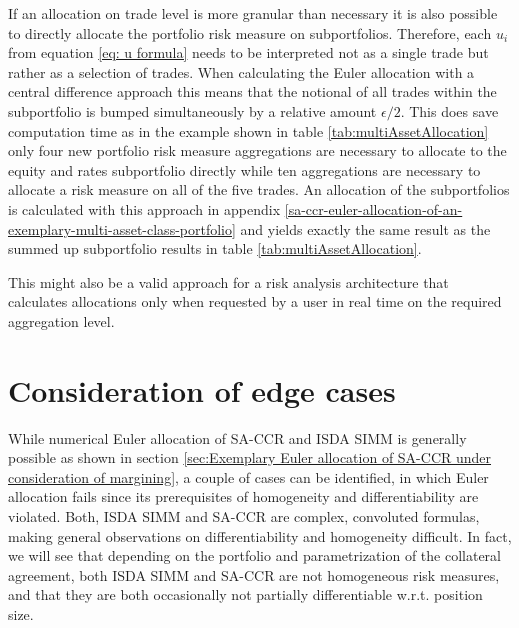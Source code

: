 \documentclass[../Thesis_AHoecherl.tex]{subfiles}
\begin{document}
    If an allocation on trade level is more granular than necessary it is also possible to directly allocate the portfolio risk measure on subportfolios. Therefore, each $u_i$ from equation \ref{eq: u formula} needs to be interpreted not as a single trade but rather as a selection of trades.
    When calculating the Euler allocation with a central difference approach this means that the notional of all trades within the subportfolio is bumped simultaneously by a relative amount $\epsilon / 2$.
    This does save computation time as in the example shown in table \ref{tab:multiAssetAllocation} only four new portfolio risk measure aggregations are necessary to allocate to the equity and rates subportfolio directly while ten aggregations are necessary to allocate a risk measure on all of the five trades. An allocation of the subportfolios is calculated with this approach in appendix \ref{sa-ccr-euler-allocation-of-an-exemplary-multi-asset-class-portfolio} and yields exactly the same result as the summed up subportfolio results in table \ref{tab:multiAssetAllocation}.

    This might also be a valid approach for a risk analysis architecture that calculates allocations only when requested by a user in real time on the required aggregation level. 

    

    \section{Consideration of edge cases\label{sec:Consideration of edge cases}}

    While numerical Euler allocation of SA-CCR and ISDA SIMM is generally possible as shown in section \ref{sec:Exemplary Euler allocation of SA-CCR under consideration of margining}, a couple of cases can be identified, in which Euler allocation fails since its prerequisites of homogeneity and differentiability are violated.
    Both, ISDA SIMM and SA-CCR are complex, convoluted formulas, making general observations on differentiability and homogeneity difficult.
    In fact, we will see that depending on the portfolio and parametrization of the collateral agreement, both ISDA SIMM and SA-CCR are not homogeneous risk measures, and that they are both occasionally not partially differentiable w.r.t. position size.
    
\end{document}
